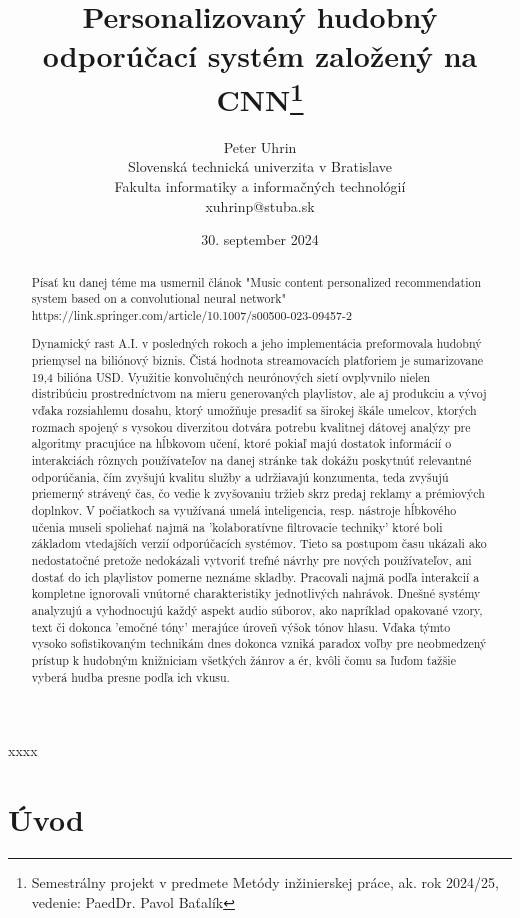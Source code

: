 \documentclass[10pt,twoside,slovak,a4paper, colorinlistoftodos]{article}
\title{Personalizovaný hudobný odporúčací systém založený na CNN\thanks{Semestrálny projekt v predmete Metódy inžinierskej práce, ak. rok 2024/25, vedenie: PaedDr. Pavol Baťalík}}
\author{Peter Uhrin\\[2pt]
	{\small Slovenská technická univerzita v Bratislave}\\
	{\small Fakulta informatiky a informačných technológií}\\
	{\small {xuhrinp@stuba.sk}}}
\date{\small 30. september 2024}
\begin{document}
xxxx

\maketitle

\begin{abstract}

Písať ku danej téme ma usmernil článok "Music content personalized recommendation system based on a convolutional neural network" 
https://link.springer.com/article/10.1007/s00500-023-09457-2

Dynamický rast A.I. v posledných rokoch a jeho implementácia preformovala hudobný priemysel na biliónový biznis. Čistá hodnota streamovacích platforiem je sumarizovane 19,4 bilióna USD. Využitie konvolučných neurónových sietí ovplyvnilo nielen distribúciu prostredníctvom na mieru generovaných playlistov, ale aj produkciu a vývoj vďaka rozsiahlemu dosahu, ktorý umožňuje presadiť sa širokej škále umelcov, ktorých rozmach spojený s vysokou diverzitou dotvára potrebu kvalitnej dátovej analýzy pre algoritmy pracujúce na hĺbkovom učení, ktoré pokiaľ majú dostatok informácií o interakciách rôznych používateľov na danej stránke tak dokážu poskytnúť relevantné odporúčania, čím zvyšujú kvalitu služby a udržiavajú konzumenta, teda zvyšujú priemerný strávený čas, čo vedie k zvyšovaniu tržieb skrz predaj reklamy a prémiových doplnkov. V počiatkoch sa využívaná umelá inteligencia, resp. nástroje hĺbkového učenia museli spoliehať najmä na 'kolaboratívne filtrovacie techniky' ktoré boli základom vtedajších verzií odporúčacích systémov. Tieto sa postupom času ukázali ako nedostatočné pretože nedokázali vytvoriť trefné návrhy pre nových používateľov, ani dostať do ich playlistov pomerne neznáme skladby. Pracovali najmä podľa interakcií a kompletne ignorovali vnútorné charakteristiky jednotlivých nahrávok. Dnešné systémy analyzujú a vyhodnocujú každý aspekt audio súborov, ako napríklad opakované vzory, text či dokonca 'emočné tóny' merajúce úroveň výšok tónov hlasu. Vďaka týmto vysoko sofistikovaným technikám dnes dokonca vzniká paradox voľby pre neobmedzený prístup k hudobným knižniciam všetkých žánrov a ér, kvôli čomu sa ľuďom ťažšie vyberá hudba presne podľa ich vkusu.

\end{abstract}



\section{Úvod}
\end{document}
